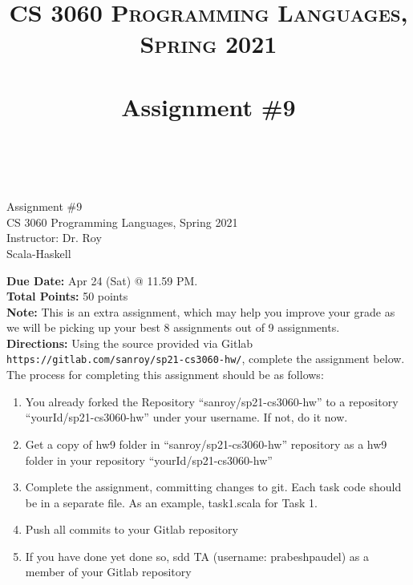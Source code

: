 \documentclass[paper=letter, fontsize=11pt]{scrartcl} %
\title{ 
    \normalfont \normalsize 
    \textsc{CS 3060 Programming Languages, Spring 2021} \\ [25pt] %
    \horrule{0.5pt} \\[0.4cm] %
    \huge Assignment \#9  \\ %
    \horrule{2pt} \\[0.5cm] %
}
\begin{document}
    \begin{center}
         Assignment \#9\\
        \small CS 3060 Programming Languages, Spring 2021 \\
        \small Instructor: Dr. Roy \\
        \huge Scala-Haskell 
    \end{center}
    
    \textbf{Due Date:} Apr 24 (Sat) @ 11.59 PM. \\
    \textbf{Total Points:} 50 points \\
    \textbf{Note:} This is an extra assignment, which may help you improve your grade as we will be picking up your best 8 assignments out of 9 assignments.\\

    \textbf{Directions:} Using the source provided via Gitlab \@ \texttt{https://gitlab.com/sanroy/sp21-cs3060-hw/},
complete the assignment below. The process for completing this assignment should be as follows:

    \begin{enumerate}[noitemsep]
        \item You already forked the Repository ``sanroy/sp21-cs3060-hw'' to a repository ``yourId/sp21-cs3060-hw'' under your username. If not, do it now.
        \item Get a copy of hw9 folder in ``sanroy/sp21-cs3060-hw'' repository as a hw9 folder in your repository ``yourId/sp21-cs3060-hw''
        \item Complete the assignment, committing changes to git. Each task code should be in a separate file. As an example, task1.scala for Task 1.
        \item Push all commits to your Gitlab repository
        \item If you have done yet done so, sdd TA (username: prabeshpaudel) as a member of your Gitlab repository
    \end{enumerate}
\end{document}
